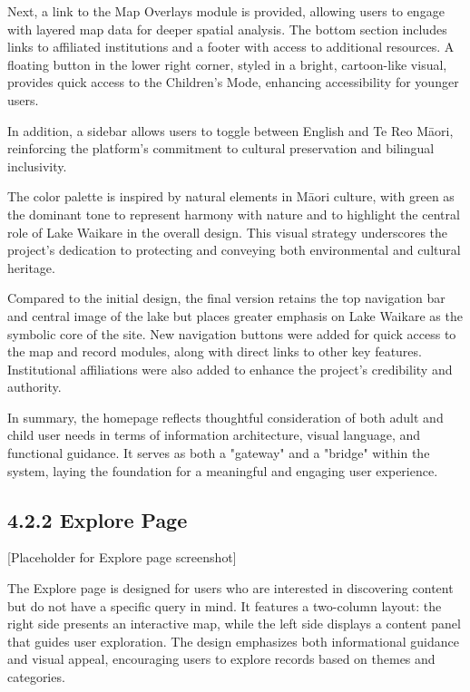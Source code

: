 Next, a link to the Map Overlays module is provided, allowing users to engage with layered map data for deeper spatial analysis. The bottom section includes links to affiliated institutions and a footer with access to additional resources. A floating button in the lower right corner, styled in a bright, cartoon-like visual, provides quick access to the Children's Mode, enhancing accessibility for younger users.

In addition, a sidebar allows users to toggle between English and Te Reo Māori, reinforcing the platform's commitment to cultural preservation and bilingual inclusivity.

The color palette is inspired by natural elements in Māori culture, with green as the dominant tone to represent harmony with nature and to highlight the central role of Lake Waikare in the overall design. This visual strategy underscores the project's dedication to protecting and conveying both environmental and cultural heritage.

Compared to the initial design, the final version retains the top navigation bar and central image of the lake but places greater emphasis on Lake Waikare as the symbolic core of the site. New navigation buttons were added for quick access to the map and record modules, along with direct links to other key features. Institutional affiliations were also added to enhance the project's credibility and authority.

In summary, the homepage reflects thoughtful consideration of both adult and child user needs in terms of information architecture, visual language, and functional guidance. It serves as both a "gateway" and a "bridge" within the system, laying the foundation for a meaningful and engaging user experience.

\subsection*{4.2.2 Explore Page}
[Placeholder for Explore page screenshot]

The Explore page is designed for users who are interested in discovering content but do not have a specific query in mind. It features a two-column layout: the right side presents an interactive map, while the left side displays a content panel that guides user exploration. The design emphasizes both informational guidance and visual appeal, encouraging users to explore records based on themes and categories.

